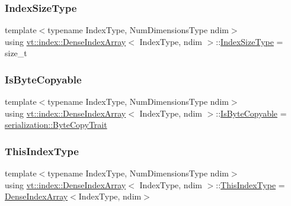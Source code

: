 \subsubsection{\texorpdfstring{Index\+Size\+Type}{IndexSizeType}}
{\footnotesize\ttfamily template$<$typename Index\+Type, Num\+Dimensions\+Type ndim$>$ \\
using \hyperlink{structvt_1_1index_1_1_dense_index_array}{vt\+::index\+::\+Dense\+Index\+Array}$<$ Index\+Type, ndim $>$\+::\hyperlink{structvt_1_1index_1_1_dense_index_array_ae2999552165f16fc69a2940e0589819f}{Index\+Size\+Type} =  size\+\_\+t}

\mbox{\label{structvt_1_1index_1_1_dense_index_array_a0d13f3168c5d8b4b3abc6cb083d34bc3}} 
\subsubsection{\texorpdfstring{Is\+Byte\+Copyable}{IsByteCopyable}}
{\footnotesize\ttfamily template$<$typename Index\+Type, Num\+Dimensions\+Type ndim$>$ \\
using \hyperlink{structvt_1_1index_1_1_dense_index_array}{vt\+::index\+::\+Dense\+Index\+Array}$<$ Index\+Type, ndim $>$\+::\hyperlink{structvt_1_1index_1_1_dense_index_array_a0d13f3168c5d8b4b3abc6cb083d34bc3}{Is\+Byte\+Copyable} =  \hyperlink{structvt_1_1serialization_1_1_byte_copy_trait}{serialization\+::\+Byte\+Copy\+Trait}}

\mbox{\label{structvt_1_1index_1_1_dense_index_array_a6915511f6a82dff2522d6e8c2be20f2a}} 
\subsubsection{\texorpdfstring{This\+Index\+Type}{ThisIndexType}}
{\footnotesize\ttfamily template$<$typename Index\+Type, Num\+Dimensions\+Type ndim$>$ \\
using \hyperlink{structvt_1_1index_1_1_dense_index_array}{vt\+::index\+::\+Dense\+Index\+Array}$<$ Index\+Type, ndim $>$\+::\hyperlink{structvt_1_1index_1_1_dense_index_array_a6915511f6a82dff2522d6e8c2be20f2a}{This\+Index\+Type} =  \hyperlink{structvt_1_1index_1_1_dense_index_array}{Dense\+Index\+Array}$<$Index\+Type, ndim$>$}




